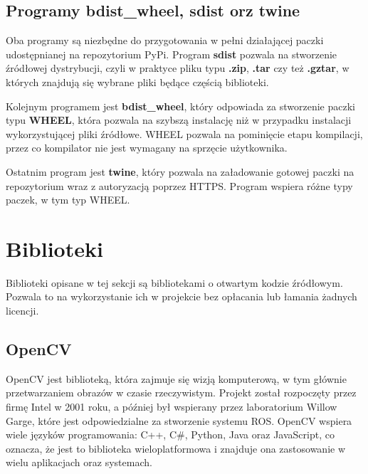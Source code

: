 \subsection{Programy bdist\_wheel, sdist orz twine}
\quad Oba programy są niezbędne do przygotowania w pełni działającej paczki udostępnianej na repozytorium PyPi. Program \textbf{sdist} pozwala na stworzenie źródłowej dystrybucji, czyli w praktyce pliku typu \textbf{.zip}, \textbf{.tar} czy też \textbf{.gztar}, w których znajdują się wybrane pliki będące częścią biblioteki. 

\quad Kolejnym programem jest \textbf{bdist\_wheel}, który odpowiada za stworzenie paczki typu \textbf{WHEEL}, która pozwala na szybszą instalację niż w przypadku instalacji wykorzystującej pliki źródłowe. WHEEL pozwala na pominięcie etapu kompilacji, przez co kompilator nie jest wymagany na sprzęcie użytkownika. 

\quad Ostatnim program jest \textbf{twine}, który pozwala na załadowanie gotowej paczki na repozytorium wraz z autoryzacją poprzez HTTPS. Program wspiera różne typy paczek, w tym typ WHEEL. 



\section{Biblioteki}

\quad Biblioteki opisane w tej sekcji są bibliotekami o otwartym kodzie źródłowym. Pozwala to na wykorzystanie ich w projekcie bez opłacania lub łamania żadnych licencji. 

\subsection{OpenCV}

\quad OpenCV \cite{bib:opencv_book} \cite{bib:opencv} jest biblioteką, która zajmuje się wizją komputerową, w tym głównie przetwarzaniem obrazów w czasie rzeczywistym. Projekt został rozpoczęty przez firmę Intel w 2001 roku, a później był wspierany przez laboratorium Willow Garge, które jest odpowiedzialne za stworzenie systemu ROS. OpenCV wspiera wiele języków programowania: C++, C\#, Python, Java oraz JavaScript, co oznacza, że jest to biblioteka wieloplatformowa i znajduje ona zastosowanie w wielu aplikacjach oraz systemach. 

